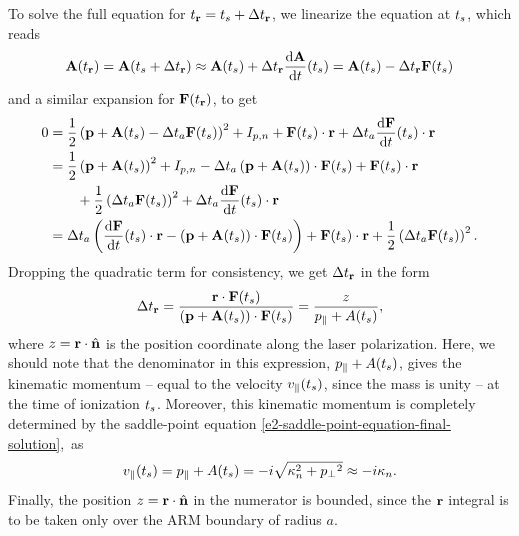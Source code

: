 To solve the full equation for ${t_{\vb{r}}}={t_s}+\Delta {t_{\ensuremath{\vb{r}}}}$, we linearize the equation at ${t_s}$, which reads
\begin{equation}
\vb{A}({t_{\vb{r}}})
=\vb{A}({t_s} +\Delta{t_{\ensuremath{\vb{r}}}})
\approx \vb{A}({t_s}) + \Delta{t_{\ensuremath{\vb{r}}}}\frac{\mathrm{d}\vb{A}}{\mathrm{d} t}({t_s})
=\vb{A}({t_s}) - \Delta{t_{\ensuremath{\vb{r}}}} \vb{F}({t_s})
\end{equation}
and a similar expansion for $\vb{F}({t_{\vb{r}}})$, to get 
\begin{align}
0
& = 
\frac{1}{2} \left(\vb{p}+\vb{A}({t_s})-\Delta t_a\vb{F}({t_s})\right)^2+ I_{p,n} + \vb{F}({t_s})\cdot\vb{r} +\Delta t_a\frac{\mathrm{d}\vb{F}}{\mathrm{d} t}({t_s})\cdot\vb{r} 
\nonumber \\ & = 
\frac{1}{2} \left(\vb{p}+\vb{A}({t_s})\right)^2+ I_{p,n}  -\Delta t_a\left(\vb{p}+\vb{A} ({t_s}) \right) \cdot\vb{F}({t_s}) + \vb{F}({t_s})\cdot\vb{r} 
\nonumber \\   & \qquad+
\frac{1}{2} \left(\Delta t_a\vb{F}({t_s})\right)^2  +\Delta t_a\frac{\mathrm{d}\vb{F}}{\mathrm{d} t}({t_s})\cdot\vb{r}
\nonumber \\ & = 
\Delta t_a\left(\frac{\mathrm{d}\vb{F}}{\mathrm{d} t}({t_s})\cdot\vb{r}-\left(\vb{p}+\vb{A}({t_s})\right)\cdot\vb{F}({t_s}) \right) + \vb{F}({t_s})\cdot\vb{r} 
+\frac{1}{2} \left(\Delta t_a\vb{F}({t_s})\right)^2 
.
\end{align}
Dropping the quadratic term for consistency, we get $\Delta{t_{\ensuremath{\vb{r}}}}$ in the form
\begin{equation}
\Delta{t_{\ensuremath{\vb{r}}}}
= \frac{\vb{r}\cdot\vb{F}({t_s})}{\left(\vb{p}+\vb{A}({t_s})\right)\cdot\vb{F}({t_s})}
=\frac{z}{{p_{\parallel}}+A({t_s})},
\end{equation}
where $z=\vb{r}\cdot\hat{\vb{n}}$ is the position coordinate along the laser polarization. Here, we should note that the denominator in this expression, ${p_{\parallel}}+A({t_s})$, gives the kinematic momentum -- equal to the velocity ${v_{\parallel}}({t_s})$, since the mass is unity -- at the time of ionization ${t_s}$. Moreover, this kinematic momentum is completely determined by the saddle-point equation \eqref{e2-saddle-point-equation-final-solution},~as 
\begin{equation}
{v_{\parallel}}({t_s})={p_{\parallel}}+A({t_s})=-i\sqrt{ \kappa_n^2+{p_{\perp}}^2} \approx -i\kappa_n.
\label{e2-vp-as-i-kappa}
\end{equation}
Finally, the position $z=\vb{r}\cdot\hat{\vb{n}}$ in the numerator is bounded, since the $\vb{r}$ integral is to be taken only over the ARM boundary of radius $a$.



